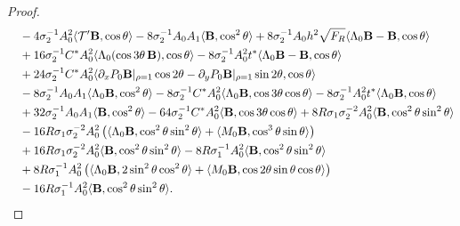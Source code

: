 \documentclass[12pt,reqno]{amsart}
\numberwithin{equation}{section}
\theoremstyle{definition}
\theoremstyle{remark}
\begin{document}
\begin{proof}
\begin{align}
&\quad -4\sigma_2^{-1}A_0^2 \langle   \mathcal{T}'  \textbf{B}, \cos\theta\rangle
-8\sigma_2^{-1}A_0A_1\langle \textbf{B}, \cos^2\theta\rangle+8\sigma_2^{-1}A_0h^2\sqrt{F_R}\langle  \Lambda_0  \textbf{B}-\textbf{B}  ,\cos\theta\rangle \notag\\
&\quad+16\sigma_2^{-1}C^*A_0^2\langle\Lambda_0( \cos3\theta\, \textbf{B}),\cos\theta\rangle-8\sigma_2^{-1}A_0^2t^*\langle\Lambda_0  \textbf{B}-\textbf{B}, \cos\theta\rangle \notag\\
&\quad +24\sigma_2^{-1}C^*A_0^2\langle \partial_xP_0\textbf{B}|_{\rho=1}\cos2\theta-
	\partial_yP_0\textbf{B}|_{\rho=1}\sin2\theta, \cos\theta\rangle \notag\\
&\quad -8\sigma_2^{-1}A_0A_1\langle \Lambda_0\textbf{B},\cos^2\theta\rangle
-8\sigma_2^{-1}C^*A_0^2\langle \Lambda_0\textbf{B}, \cos3\theta\cos\theta\rangle-8\sigma_2^{-1}A_0^2t^*\langle \Lambda_0\textbf{B}, \cos\theta\rangle \notag\\
&\quad +32\sigma_2^{-1}A_0A_1\langle \textbf{B}, \cos^2\theta\rangle
-64\sigma_2^{-1}C^*A_0^2\langle\textbf{B},\cos3\theta\cos\theta\rangle +8R\sigma_1\sigma_2^{-2}A_0^2\langle \textbf{B}, \cos^2\theta\sin^2\theta\rangle \notag\\
&\quad -16R\sigma_1\sigma_2^{-2}A_0^2
\left(\langle \Lambda_0\textbf{B}, \cos^2\theta\sin^2\theta\rangle
+\langle M_0\textbf{B}, \cos^3\theta\sin\theta\rangle\right) \notag\\
&\quad +16R\sigma_1\sigma_2^{-2}A_0^2\langle \textbf{B}, \cos^2\theta\sin^2\theta\rangle
-8R\sigma_1^{-1}A_0^2\langle \textbf{B}, \cos^2\theta\sin^2\theta\rangle \notag\\
&\quad +8R\sigma_1^{-1}A_0^2\left(\langle \Lambda_0\textbf{B}, 2\sin^2\theta\cos^2\theta\rangle
+\langle M_0\textbf{B}, \cos2\theta\sin\theta\cos\theta\rangle\right) \notag\\
&\quad -16R\sigma_1^{-1}A_0^2\langle \textbf{B}, \cos^2\theta\sin^2\theta\rangle. 
\end{align}


\end{proof}
\end{document}
